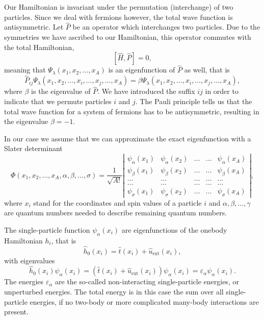 \documentclass[%
oneside,                 %
final,                   %
10pt]{article}
\begin{document}
Our Hamiltonian is invariant under the permutation (interchange) of two particles.
Since we deal with fermions however, the total wave function is antisymmetric.
Let $\hat{P}$ be an operator which interchanges two particles.
Due to the symmetries we have ascribed to our Hamiltonian, this operator commutes with the total Hamiltonian,
\[
[\hat{H},\hat{P}] = 0,
 \]
meaning that $\Psi_{\lambda}(x_1, x_2, \dots , x_A)$ is an eigenfunction of 
$\hat{P}$ as well, that is
\[
\hat{P}_{ij}\Psi_{\lambda}(x_1, x_2, \dots,x_i,\dots,x_j,\dots,x_A)=
\beta\Psi_{\lambda}(x_1, x_2, \dots,x_i,\dots,x_j,\dots,x_A),
\]
where $\beta$ is the eigenvalue of $\hat{P}$. We have introduced the suffix $ij$ in order to indicate that we permute particles $i$ and $j$.
The Pauli principle tells us that the total wave function for a system of fermions
has to be antisymmetric, resulting in the eigenvalue $\beta = -1$.   



In our case we assume that  we can approximate the exact eigenfunction with a Slater determinant
\begin{equation}
   \Phi(x_1, x_2,\dots ,x_A,\alpha,\beta,\dots, \sigma)=\frac{1}{\sqrt{A!}}
\left| \begin{array}{ccccc} \psi_{\alpha}(x_1)& \psi_{\alpha}(x_2)& \dots & \dots & \psi_{\alpha}(x_A)\\
                            \psi_{\beta}(x_1)&\psi_{\beta}(x_2)& \dots & \dots & \psi_{\beta}(x_A)\\  
                            \dots & \dots & \dots & \dots & \dots \\
                            \dots & \dots & \dots & \dots & \dots \\
                     \psi_{\sigma}(x_1)&\psi_{\sigma}(x_2)& \dots & \dots & \psi_{\sigma}(x_A)\end{array} \right|, \label{eq:HartreeFockDet}
\end{equation}
where  $x_i$  stand for the coordinates and spin values of a particle $i$ and $\alpha,\beta,\dots, \gamma$ 
are quantum numbers needed to describe remaining quantum numbers.  




The single-particle function $\psi_{\alpha}(x_i)$  are eigenfunctions of the onebody
Hamiltonian $h_i$, that is
\[
\hat{h}_0(x_i)=\hat{t}(x_i) + \hat{u}_{\mathrm{ext}}(x_i),
\]
with eigenvalues 
\[
\hat{h}_0(x_i) \psi_{\alpha}(x_i)=\left(\hat{t}(x_i) + \hat{u}_{\mathrm{ext}}(x_i)\right)\psi_{\alpha}(x_i)=\varepsilon_{\alpha}\psi_{\alpha}(x_i).
\]
The energies $\varepsilon_{\alpha}$ are the so-called non-interacting single-particle energies, or unperturbed energies. 
The total energy is in this case the sum over all  single-particle energies, if no two-body or more complicated
many-body interactions are present.
\end{document}
